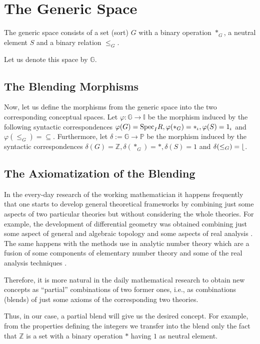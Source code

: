 \section{The Generic Space}

The generic space consists of a set (sort) $G$ with a binary operation $*_G$, a neutral element $S$ and a binary relation $\leq_G$.

  Let us denote this space by $\mathbb{G}$.

\subsection{The Blending Morphisms}
Now, let us define the morphisms from the generic space into the two corresponding conceptual spaces. Let $\varphi: \mathbb{G}\rightarrow \mathbb{I}$ be the morphism induced by the following syntactic correspondences $\varphi(G)={\rm Spec}_IR,\varphi(*_G)=*_{\iota}, \varphi(S)=1_{\iota}$ and $\varphi(\leq_G)=\subseteq$.
\newline\indent
Furthermore, let $\delta:=\mathbb{G}\rightarrow\mathbb{P}$ be the morphism induced by the syntactic correspondences $\delta(G)=\mathbb{Z}, \delta(*_G)=*, \delta(S)=1$ and $\delta(\leq_G)= \lfloor$.

\subsection{The Axiomatization of the Blending}
In the every-day research of the working mathematician it happens
frequently that one starts to develop general theoretical frameworks
by combining just some aspects of two particular theories but without
considering the whole theories. For example, the development of
differential geometry was obtained combining just some aspect of
general and algebraic topology and some aspects of real analysis
\cite{VelCad05}. The same happens with the methods use in
analytic number theory which are a fusion of some components of
elementary number theory and some of the real analysis techniques
\parencite{Apostol76}.

Therefore, it is more natural in the daily mathematical research to
obtain new concepts as ``partial'' combinations of two former ones,
i.e., as combinations (blends) of just some axioms of the
corresponding two theories.
 
Thus, in our case, a partial blend will give us the desired
concept. For example, from the properties defining the integers we
transfer into the blend only the fact that $\mathbb{Z}$ is a set with
a binary operation $*$ having $1$ as neutral element.

